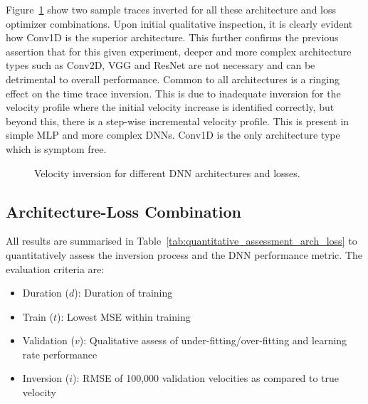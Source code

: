 Figure~\ref{fig:dnn_fwi_1_vel_results} show two sample traces inverted for all these architecture and loss optimizer combinations. Upon initial qualitative inspection, it is clearly evident how Conv1D is the superior architecture. This further confirms the previous assertion that for this given experiment, deeper and more complex architecture types such as Conv2D, VGG and ResNet are not necessary and can be detrimental to overall performance. Common to all architectures is a ringing effect on the time trace inversion. This is due to inadequate inversion for the velocity profile where the initial velocity increase is identified correctly, but beyond this, there is a step-wise incremental velocity profile. This is present in simple MLP and more complex DNNs. Conv1D is the only architecture type which is symptom free. 

\begin{figure}[!ht]
	\centering
    \caption[Velocity inversion for different DNN architectures and losses.]{Velocity inversion for different DNN architectures and losses.}
    \label{fig:dnn_fwi_1_vel_results}
\end{figure}

\clearpage
\subsection{Architecture-Loss Combination}\label{sec:results_arch_loss_combination}
All results are summarised in Table~\ref{tab:quantitative_assessment_arch_loss} to quantitatively assess the inversion process and the DNN performance metric. The evaluation criteria are:
\begin{itemize}
    \itemsep0em
    \item Duration ($d$): 	Duration of training
    \item Train ($t$): 		Lowest MSE within training
    \item Validation ($v$): Qualitative assess of under-fitting/over-fitting and learning rate performance
    \item Inversion ($i$):	RMSE of 100,000 validation velocities as compared to true velocity
\end{itemize}

